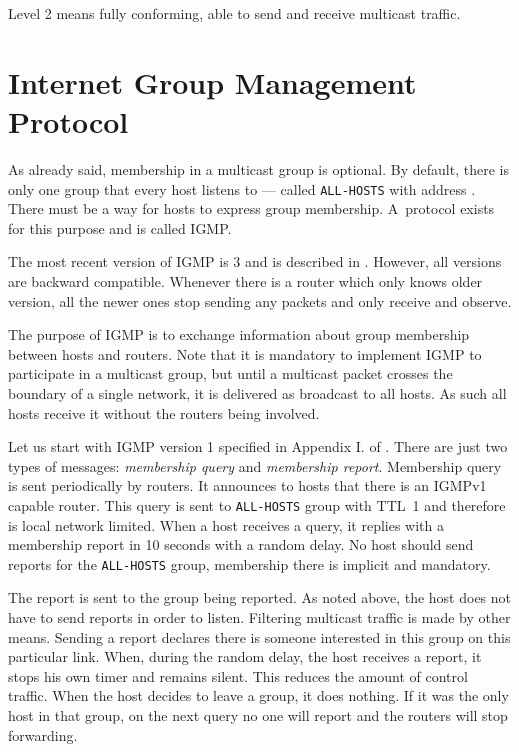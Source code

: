 Level 2 means fully conforming, able to send and receive multicast traffic.

\section{Internet Group Management Protocol}

As already said, membership in a multicast group is optional. By default, there
is only one group that every host listens to --- called \texttt{ALL-HOSTS} with address
. There must be a way for hosts to express group membership.
A~protocol exists for this purpose and is called IGMP.

The most recent version of IGMP is 3 and is described in . However, all
versions are backward compatible. Whenever there is a router which only knows
older version, all the newer ones stop sending any packets and only receive and observe.

The purpose of IGMP is to exchange information about group membership between
hosts and routers. Note that it is mandatory to implement IGMP to participate in
a multicast group, but until a multicast packet crosses the boundary of a single network, it
is delivered as broadcast to all hosts. As such all hosts receive it without
the routers being involved.

Let us start with IGMP version 1 specified in Appendix I. of . There
are just two types of messages: \emph{membership query} and \emph{membership report}.
Membership query is sent periodically by routers. It announces to hosts that there
is an IGMPv1 capable router. This query is sent to \texttt{ALL-HOSTS} group with TTL~1 and
therefore is local network limited. When a host receives a query, it replies with
a membership report in 10 seconds with a random delay. No host should send
reports for the \texttt{ALL-HOSTS} group, membership there is implicit and mandatory.

The report is sent to the group being reported. As noted above, the host does not have
to send reports in order to listen. Filtering multicast traffic is made by other means.
Sending a report declares there is someone interested in this group on this
particular link. When, during the random delay, the host receives a report, it
stops his own timer and remains silent. This reduces the amount of control
traffic. When the host decides to leave a group, it does nothing. If it was the
only host in that group, on the next query no one will report and the routers will
stop forwarding.


